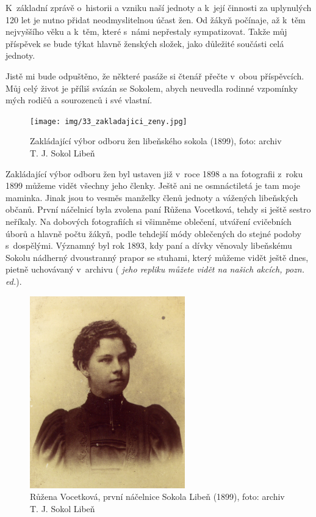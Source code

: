 \documentclass[a5paper, 11pt, twoside]{article}
\newcommand{\pozned}[1]{%
\textit{#1}}
\begin{document}
K~základní zprávě o~historii a vzniku naší jednoty a k~její činnosti za
uplynulých 120 let je nutno přidat neodmyslitelnou účast žen. Od žákyň
počínaje, až k~těm nejvyššího věku a k~těm, které s~námi nepřestaly
sympatizovat. Takže můj příspěvek se bude týkat hlavně ženských složek,
jako důležité součásti celá jednoty.

Jistě mi bude odpuštěno, že některé pasáže si čtenář přečte v~obou
příspěvcích. Můj celý život je příliš svázán se Sokolem, abych neuvedla
rodinné vzpomínky mých rodičů a sourozenců i své vlastní.

\begin{figure}[h!]
  \centering 
  \texttt{[image: img/33\_zakladajici\_zeny.jpg]}
  \caption*{Zakládající výbor odboru žen libeňského sokola (1899), foto:
  archiv T. J. Sokol Libeň}
\end{figure}

Zakládající výbor odboru žen byl ustaven již v~roce 1898 a na fotografii
z~roku 1899 můžeme vidět všechny jeho členky. Ještě ani ne osmnáctiletá
je tam moje maminka. Jinak jsou to vesměs manželky členů jednoty a
vážených libeňských občanů. První náčelnicí byla zvolena paní Růžena
Vocetková, tehdy si ještě sestro neříkaly. Na dobových fotografiích si
všimněme oblečení, utváření cvičebních úborů a hlavně počtu žákyň, podle
tehdejší módy oblečených do stejné podoby s~dospělými. Významný byl rok
1893, kdy paní a dívky věnovaly libeňskému Sokolu nádherný dvoustranný
prapor se stuhami, který můžeme vidět ještě dnes, pietně uchovávaný
v~archivu (\pozned{jeho repliku můžete vidět na našich akcích, pozn. ed.}).

\begin{figure}[h!]
  \centering 
  \includegraphics[width=0.6\textwidth]{img/34_vocetkova_nacelnice.jpg}
  \caption*{Růžena Vocetková, první náčelnice Sokola Libeň (1899), foto:
  archiv T. J. Sokol Libeň}
\end{figure}
\end{document}
